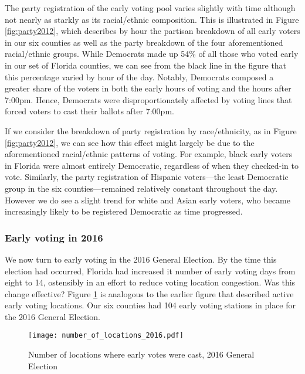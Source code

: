 \documentclass[12pt,titlepage]{article}
\begin{document}
The party registration of the early voting pool varies slightly with
time although not nearly as starkly as its racial/ethnic composition.
This is illustrated in Figure \ref{fig:party2012}, which describes by
hour the partisan breakdown of all early voters in our six counties as
well as the party breakdown of the four aforementioned racial/ethnic
groups.  While Democrats made up 54\% of all those who voted early in
our set of Florida counties, we can see from the black line in the
figure that this percentage varied by hour of the day.  Notably,
Democrats composed a greater share of the voters in both the early
hours of voting and the hours after 7:00pm.  Hence, Democrats were
disproportionately affected by voting lines that forced voters to cast
their ballots after 7:00pm.


If we consider the breakdown of party registration by race/ethnicity,
as in Figure \ref{fig:party2012}, we can see how this effect might
largely be due to the aforementioned racial/ethnic patterns of voting.
For example, black early voters in Florida were almost entirely
Democratic, regardless of when they checked-in to vote.  Similarly,
the party registration of Hispanic voters---the least Democratic group
in the six counties---remained relatively constant throughout the day.
However we do see a slight trend for white and Asian early voters, who
became increasingly likely to be registered Democratic as time
progressed.


\subsubsection*{Early voting in 2016}

We now turn to early voting in the 2016 General Election.  By the time
this election had occurred, Florida had increased it number of early
voting days from eight to 14, ostensibly in an effort to reduce voting
location congestion. Was this change effective?  Figure
\ref{fig:nrlocs2016} is analogous to the earlier figure that described
active early voting locations. Our six counties had 104 early voting
stations in place for the 2016 General Election.


\begin{figure}[!ht]
  \caption{Number of locations where early votes were cast, 2016 General
    Election}
  \label{fig:nrlocs2016}
  \centering
    \centering\texttt{[image: number\_of\_locations\_2016.pdf]}
\end{figure}
\end{document}
